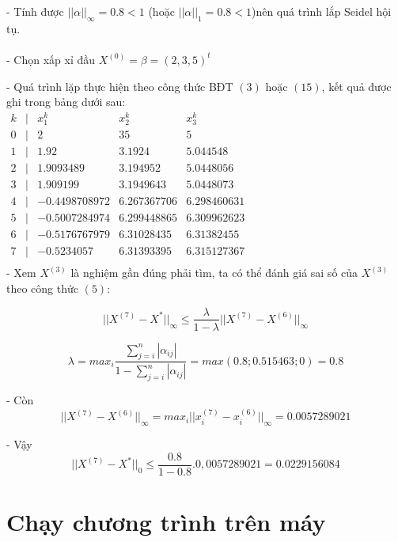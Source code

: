 \documentclass[12pt,a4paper]{article}
\begin{document}
\begin{itemize}
- Tính được $ ||\alpha||_{\infty} = 0.8 < 1$ (hoặc $ ||\alpha||_{1} = 0.8 < 1$)nên quá trình lắp Seidel hội tụ.\\

\\

- Chọn xấp xỉ đầu $ X^{(0)} = \beta = (2, 3, 5)^t$

\newpage

- Quá trình lặp thực hiện theo công thức BĐT $(3)$ hoặc $(15)$, kết quả được ghi trong bảng dưới sau:\\

$ \begin{matrix} k&|&x_1^k&x_2^k&x_3^k\\ 0&|&2&35&5 \\ 1&|&1.92&3.1924&5.044548\\ 2&|&1.9093489&3.194952&5.0448056 \\ 3&|&1.909199&3.1949643&5.0448073 \\ 4&|&-0.4498708972&6.267367706&6.298460631 \\ 5&|&-0.5007284974&6.299448865&6.309962623 \\ 6&|&-0.5176767979&6.31028435&6.31382455 \\ 7&|&-0.5234057&6.31393395&6.315127367 \\ \end{matrix}$\\

- Xem $X^{(3)}$ là nghiệm gần đúng phải tìm, ta có thể đánh giá sai số của $X^{(3)}$ theo công thức $(5)$:

$$ ||X^{(7)} - X^*||_{\infty} \leqslant \frac{\lambda}{1 - \lambda} ||X^{(7)} - X^{(6)}||_{\infty}$$

$$ \lambda = max_i \frac{\sum\limits_{j = i}^n {{|{\alpha}_{ij}|}}}{1 - \sum\limits_{j = i}^n {{|{\alpha}_{ij}|}}} = max(0.8; 0.515463; 0) = 0.8$$

- Còn $$ ||X^{(7)} - X^{(6)}||_{\infty} = max_i ||x_i^{(7)} - x_i^{(6)}||_{\infty} = 0.0057289021$$

- Vậy $$ ||X^{(7)} - X^{*}||_{0} \leqslant \frac{0.8}{1 - 0.8}.0,0057289021 = 0.0229156084$$

\end{itemize}
\newpage

\section{Chạy chương trình trên máy}
\end{document}

